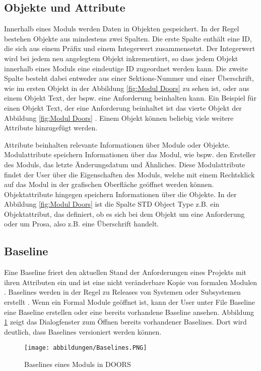 \subsection{Objekte und Attribute}
Innerhalb eines Moduls werden Daten in Objekten gespeichert. In der Regel bestehen Objekte aus mindestens zwei Spalten. Die erste 
Spalte enthält eine ID, die sich aus einem Präfix und einem Integerwert zusammensetzt. Der Integerwert wird bei jedem neu angelegtem 
Objekt inkrementiert, so dass jedem Objekt innerhalb eines Moduls eine eindeutige ID zugeordnet werden kann.
Die zweite Spalte besteht dabei entweder aus einer Sektions-Nummer und einer Überschrift, wie im ersten Objekt in der Abbildung 
\ref*{fig:Modul Doors} zu sehen ist, oder aus einem Objekt Text, der bspw. eine Anforderung beinhalten kann. Ein Beispiel für 
einen Objekt Text, der eine Anforderung beinhaltet ist das vierte Objekt der Abbildung \ref*{fig:Modul Doors} \cite[S.178]{DOORS}.
Einem Objekt können beliebig viele weitere Attribute hinzugefügt werden. 

Attribute beinhalten relevante Informationen über Module oder Objekte. Modulattribute speichern Informationen über das Modul, wie bspw.
den Ersteller des Moduls, das letzte Änderungsdatum und Ähnliches. Diese Modulattribute findet der User über die Eigenschaften des Moduls, 
welche mit einem Rechtsklick auf das Modul in der grafischen Oberfläche geöffnet werden können. Objektattribute hingegen
speichern Informationen über die Objekte. In der Abbildung \ref*{fig:Modul Doors} ist die Spalte STD Object Type z.B. ein Objektattribut,
das definiert, ob es sich bei dem Objekt um eine Anforderung oder um Prosa, also z.B. eine Überschrift handelt.

\subsection{Baseline}
Eine Baseline friert den aktuellen Stand der Anforderungen eines Projekts mit ihren Attributen ein und ist eine nicht veränderbare Kopie von 
formalen Modulen \cite[S.182]{DOORS}. Baselines werden in der Regel zu Releases von Systemen oder Subsystemen erstellt \cite[S.60]{RM-PE}. 
Wenn ein Formal Module geöffnet ist, kann der User unter File \textrightarrow{} Baseline eine Baseline erstellen oder eine bereits vorhandene 
Baseline ansehen. Abbildung \ref*{fig:Baselines} zeigt das Dialogfenster zum Öffnen bereits vorhandener Baselines. Dort wird deutlich, 
dass Baselines versioniert werden können.

\begin{figure}[h]
    \centering
    \texttt{[image: abbildungen/Baselines.PNG]}
    \caption{Baselines eines Moduls in \ac{DOORS}}
    \label{fig:Baselines}
\end{figure}

